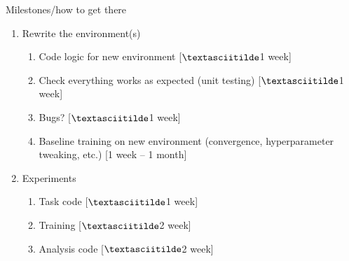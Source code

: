 \documentclass[bigger]{beamer}
\begin{document}
\begin{frame}[<+->][label={sec:orgb70ba54}]{Milestones/how to get there}
\begin{enumerate}
\item Rewrite the environment(s) 
\begin{enumerate}
\item Code logic for new environment \colorbox{black!15!white}{[$\textasciitilde$1 week]}
\item Check everything works as expected (unit testing) \colorbox{black!15!white}{[$\textasciitilde$1 week]}
\item Bugs? \colorbox{black!15!white}{[$\textasciitilde$1 week]}
\item Baseline training on new environment (convergence, hyperparameter tweaking, etc.)  \colorbox{black!15!white}{[1 week -- 1 month]}
\end{enumerate}
\item Experiments
\begin{enumerate}
\item Task code  \colorbox{black!15!white}{[$\textasciitilde$1 week]}
\item Training  \colorbox{black!15!white}{[$\textasciitilde$2 week]}
\item Analysis code  \colorbox{black!15!white}{[$\textasciitilde$2 week]}
\end{enumerate}
\end{enumerate}
\end{frame}
\end{document}
